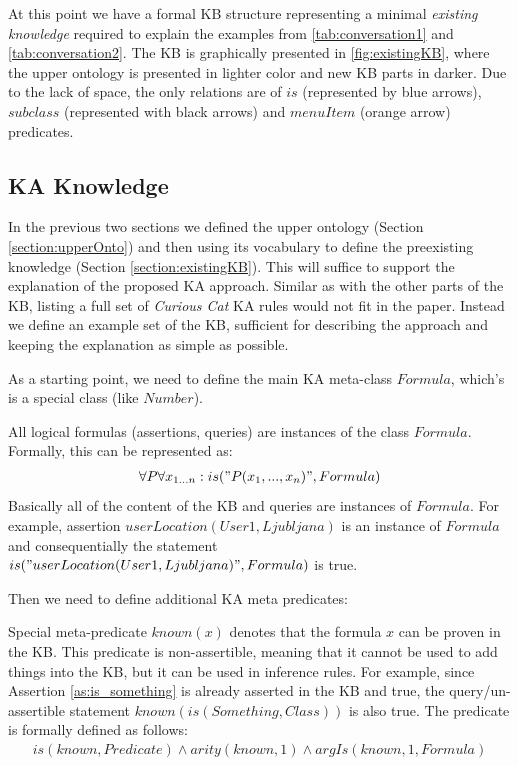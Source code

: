 At this point we have a formal KB structure representing a minimal \emph{existing knowledge} required to explain the examples from 
\autoref{tab:conversation1} and \autoref{tab:conversation2}. The KB is
graphically presented in \autoref{fig:existingKB}, where the upper ontology
is presented in lighter color and new KB parts in darker. Due to the lack of space,
the only relations are of $is$ (represented by blue arrows), $subclass$ 
(represented with black arrows) and $menuItem$ (orange arrow) predicates.

\subsection{KA Knowledge}
\label{section:kakb}
In the previous two sections we defined the upper ontology
(Section \ref{section:upperOnto}) and then using its vocabulary to define the 
preexisting knowledge (Section \ref{section:existingKB}). This will suffice to
support the explanation of the proposed KA approach. Similar as with the other
parts of the KB, listing a full set of 
\emph{Curious Cat} KA rules would not fit in the paper. Instead we define an 
example set of the KB, sufficient for describing the approach and keeping the 
explanation as simple as possible. 

As a starting point, we need to define the main KA meta-class $Formula$, which’s 
is a special class (like $Number$).
\begin{definition}\label{def:formula}
All logical formulas (assertions, queries) are instances of the class $Formula$.
Formally, this can be represented as:
\begin{equation}\label{as:formulas}
\begin{gathered}
	\forall P\forall x_{1...n}:is("P(x_1,...,x_n)",Formula)
\end{gathered}
\end{equation}
Basically all of the content of the KB and queries are instances of $Formula$.
For example, assertion $userLocation(User1,Ljubljana)$ is an instance of 
$Formula$ and consequentially the statement $is("userLocation(User1,Ljubljana)",
Formula)$ is true.
\end{definition}

Then we need to define additional KA meta predicates:

\begin{definition}\label{def:pred_known}
Special meta-predicate $known(x)$ denotes that the formula $x$ can be proven 
in the KB. This predicate is non-assertible, meaning that it cannot be used
to add things into the KB, but it can be used in inference rules. For example,
since Assertion \ref{as:is_something} is already asserted in the KB and 
true, the query/un-assertible statement $known(is(Something,Class))$ is also 
true. The predicate is formally defined as follows:
\begin{equation}\label{as:known}
\begin{gathered}
	is(known,Predicate) \land arity(known,1) \land argIs(known,1,Formula)
\end{gathered}
\end{equation}
\end{definition}

